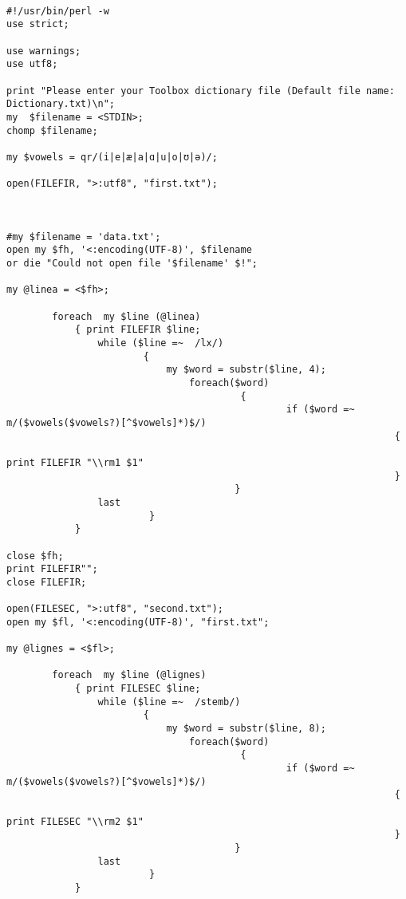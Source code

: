 \documentclass[11pt, a4paper]{book}              %
\begin{document}
\begin{lstlisting}

#!/usr/bin/perl -w
use strict;

use warnings;
use utf8;

print "Please enter your Toolbox dictionary file (Default file name: Dictionary.txt)\n";
my  $filename = <STDIN>;
chomp $filename;

my $vowels = qr/(i|e|æ|a|ɑ|u|o|ʊ|ə)/;

open(FILEFIR, ">:utf8", "first.txt");



#my $filename = 'data.txt';
open my $fh, '<:encoding(UTF-8)', $filename
or die "Could not open file '$filename' $!";
  
my @linea = <$fh>;

        foreach  my $line (@linea) 
            { print FILEFIR $line;
                while ($line =~  /lx/)
                        {
                            my $word = substr($line, 4);
                                foreach($word)
                                         {  
                                                 if ($word =~  m/($vowels($vowels?)[^$vowels]*)$/)
                                                                    {  
                                                                            print FILEFIR "\\rm1 $1" 
                                                                    }
                                        }
                last
                         }
            }
             
close $fh;
print FILEFIR"";
close FILEFIR;

open(FILESEC, ">:utf8", "second.txt");
open my $fl, '<:encoding(UTF-8)', "first.txt";

my @lignes = <$fl>;

        foreach  my $line (@lignes) 
            { print FILESEC $line;
                while ($line =~  /stemb/)
                        {
                            my $word = substr($line, 8);
                                foreach($word)
                                         {  
                                                 if ($word =~  m/($vowels($vowels?)[^$vowels]*)$/)
                                                                    {  
                                                                            print FILESEC "\\rm2 $1" 
                                                                    }
                                        }
                last
                         }
            }
             

\end{lstlisting}
\end{document}
